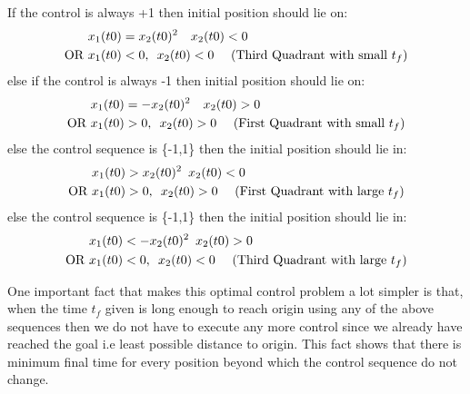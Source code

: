 \begin{enumerate}
If the control is always +1 then initial position should lie on:
  \begin{align*}
   x_1(t0) &= x_2(t0)^2 \quad x_2(t0) < 0 \\
   \mbox{OR } x_1(t0) &< 0 , \enskip x_2(t0) < 0 \quad \mbox{ (Third Quadrant with small } t_f)
  \end{align*}
else if the control is always -1 then initial position should lie on:
  \begin{align*}
   x_1(t0) &= -x_2(t0)^2 \quad x_2(t0) > 0\\
   \mbox{OR } x_1(t0) &> 0 , \enskip x_2(t0) > 0 \quad \mbox{ (First Quadrant with small } t_f)
  \end{align*}
else the control sequence is \{-1,1\} then the initial position should lie in:
  \begin{align*}
   x_1(t0) &> x_2(t0)^2 \enskip x_2(t0) < 0\\
   \mbox{OR } x_1(t0) &> 0 , \enskip x_2(t0) > 0 \quad \mbox{ (First Quadrant with large } t_f)
  \end{align*}
else the control sequence is \{-1,1\} then the initial position should lie in:
  \begin{align*}
   x_1(t0) &< -x_2(t0)^2 \enskip x_2(t0) > 0\\
   \mbox{OR } x_1(t0) &< 0 , \enskip x_2(t0) < 0 \quad \mbox{ (Third Quadrant with large } t_f)
  \end{align*}


One important fact that makes this optimal control problem a lot simpler is that, when the time $t_f$ given is long enough to reach origin
using any of the above sequences then we do not have to execute any more control since we already have reached the goal i.e least possible distance to origin. This fact
shows that there is minimum final time for every position beyond which the control sequence do not change. 


\end{enumerate}
